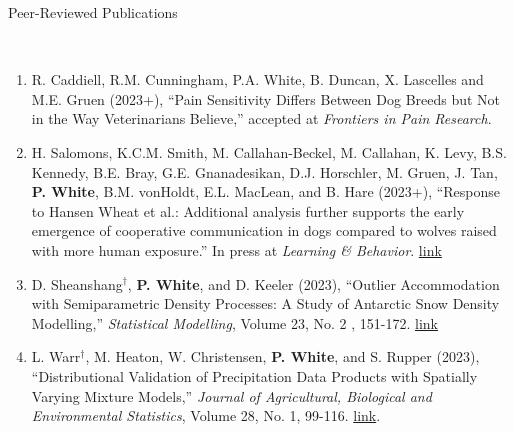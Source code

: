 \documentclass[11pt]{article}
\newcommand{\head}[1]{ %
    \bigskip %
    \begin{large}\begin{bf}{#1}\end{bf}\end{large} %

    \ \\ [-1.3cm] %

    \hrulefill}
\begin{document}
\vspace{2mm}
\head{Peer-Reviewed Publications}

\begin{enumerate}[label=$\bullet$]






\item R. Caddiell, R.M. Cunningham, P.A. White, B. Duncan, X. Lascelles and M.E. Gruen (2023+), ``Pain Sensitivity Differs Between Dog Breeds but Not in the Way Veterinarians Believe,'' accepted at \emph{Frontiers in Pain Research}. 

\item H. Salomons, K.C.M. Smith, M. Callahan-Beckel, M. Callahan, K. Levy, B.S. Kennedy, B.E. Bray, G.E. Gnanadesikan, D.J. Horschler, M. Gruen, J. Tan, \textbf{P. White}, B.M. vonHoldt, E.L. MacLean, and B. Hare (2023+), ``Response to Hansen Wheat et al.: Additional analysis further supports the early emergence of cooperative communication in dogs compared to wolves raised with more human exposure.'' In press at \emph{Learning \& Behavior}. \href{https://doi.org/10.3758/s13420-023-00576-2}{link}




\item D. Sheanshang$^\dagger$, \textbf{P. White}, and D. Keeler (2023), ``Outlier Accommodation with Semiparametric Density Processes: A Study of Antarctic Snow Density Modelling,''  \emph{Statistical Modelling}, Volume 23, No. 2 , 151-172. \href{https://doi.org/10.1177/1471082X211043946}{link}



\item L. Warr$^\dagger$, M. Heaton, W. Christensen, \textbf{P. White}, and S. Rupper (2023), ``Distributional Validation of Precipitation Data Products with Spatially Varying Mixture Models,'' \emph{Journal of Agricultural, Biological and Environmental Statistics}, Volume 28, No. 1, 99-116. \href{https://doi.org/10.1007/s13253-022-00515-0}{link}.


\end{enumerate}
\end{document}
